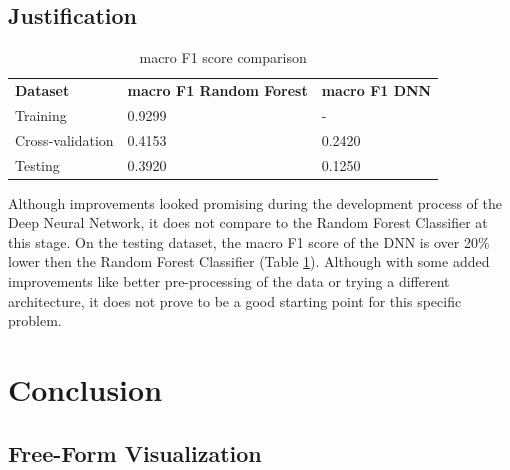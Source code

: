 \documentclass[preprint,12pt]{elsarticle}
\begin{document}
\subsection{Justification}

\begin{table}[]
\begin{tabular}{lll}
\textbf{Dataset} & \textbf{macro F1 Random Forest} & \textbf{macro F1 DNN}\\
Training & 0.9299 & - \\
Cross-validation & 0.4153 & 0.2420 \\
Testing & 0.3920 & 0.1250
\end{tabular}
\caption{macro F1 score comparison}
\label{table:comparison_F1}
\end{table}
Although improvements looked promising during the development process of the Deep Neural Network, it does not compare to the Random Forest Classifier at this stage. On the testing dataset, the macro F1 score of the DNN is over 20\% lower then the Random Forest Classifier (Table \ref{table:comparison_F1}). Although with some added improvements like better pre-processing of the data or trying a different architecture, it does not prove to be a good starting point for this specific problem.

\section{Conclusion}
\label{S:5}

\subsection{Free-Form Visualization}
\end{document}
